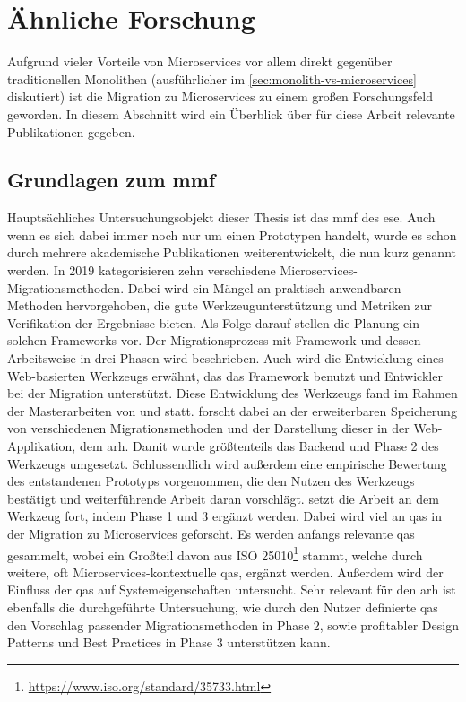 \section{Ähnliche Forschung}

Aufgrund vieler Vorteile von Microservices vor allem direkt gegenüber traditionellen Monolithen (ausführlicher im \cref{sec:monolith-vs-microservices} diskutiert) ist die Migration zu Microservices zu einem großen Forschungsfeld geworden.
In diesem Abschnitt wird ein Überblick über für diese Arbeit relevante Publikationen gegeben.

\subsection{Grundlagen zum \gls{mmf}}

Hauptsächliches Untersuchungsobjekt dieser Thesis ist das \gls{mmf} des \gls{ese}.
Auch wenn es sich dabei immer noch nur um einen Prototypen handelt, wurde es schon durch mehrere akademische Publikationen weiterentwickelt, die nun kurz genannt werden.
In 2019 kategorisieren  zehn verschiedene Microservices-Migrationsmethoden.
Dabei wird ein Mängel an praktisch anwendbaren Methoden hervorgehoben, die gute Werkzeugunterstützung und Metriken zur Verifikation der Ergebnisse bieten.
Als Folge darauf stellen  die Planung ein solchen Frameworks vor.
Der Migrationsprozess mit Framework und dessen Arbeitsweise in drei Phasen wird beschrieben.
Auch wird die Entwicklung eines Web-basierten Werkzeugs erwähnt, das das Framework benutzt und Entwickler bei der Migration unterstützt.
Diese Entwicklung des Werkzeugs fand im Rahmen der Masterarbeiten von  und  statt.
 forscht dabei an der erweiterbaren Speicherung von verschiedenen Migrationsmethoden und der Darstellung dieser in der Web-Applikation, dem \gls{arh}.
Damit wurde größtenteils das Backend und Phase 2 des Werkzeugs umgesetzt.
Schlussendlich wird außerdem eine empirische Bewertung des entstandenen Prototyps vorgenommen, die den Nutzen des Werkzeugs bestätigt und weiterführende Arbeit daran vorschlägt.
 setzt die Arbeit an dem Werkzeug fort, indem Phase 1 und 3 ergänzt werden.
Dabei wird viel an \glspl{qa} in der Migration zu Microservices geforscht.
Es werden anfangs relevante \glspl{qa} gesammelt, wobei ein Großteil davon aus ISO 25010\footnote{\url{https://www.iso.org/standard/35733.html}} stammt, welche durch weitere, oft Microservices-kontextuelle \glspl{qa}, ergänzt werden.
Außerdem wird der Einfluss der \glspl{qa} auf Systemeigenschaften untersucht.
Sehr relevant für den \gls{arh} ist ebenfalls die durchgeführte Untersuchung, wie durch den Nutzer definierte \glspl{qa} den Vorschlag passender Migrationsmethoden in Phase 2, sowie profitabler Design Patterns und Best Practices in Phase 3 unterstützen kann.

